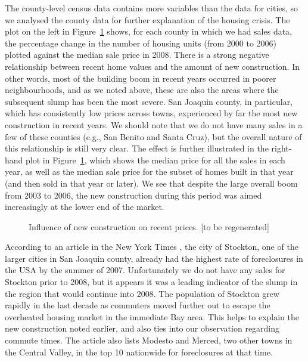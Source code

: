 \documentclass[oneside]{article}
\begin{document}
The county-level census data contains more variables than the data for cities, so we analysed the county data for further explanation of the housing crisis. The plot on the left in Figure~\ref{fig:newconstruct} shows, for each county in which we had sales data, the percentage change in the number of housing units (from 2000 to 2006) plotted against the median sale price in 2008. There is a strong negative relationship between recent home values and the amount of new construction. In other words, most of the building boom in recent years occurred in poorer neighbourhoods, and as we noted above, these are also the areas where the subsequent slump has been the most severe. San Joaquin county, in particular, which has consistently low prices across towns, experienced by far the most new construction in recent years.  We should note that we do not have many sales in a few of these counties (e.g., San Benito and Santa Cruz), but the overall nature of this relationship is still very clear. The effect is further illustrated in the right-hand plot in Figure~\ref{fig:newconstruct}, which shows the median price for all the sales in each year, as well as the median sale price for the subset of homes built in that year (and then sold in that year or later). We see that despite the large overall boom from 2003 to 2006, the new construction during this period was aimed increasingly at the lower end of the market.  

\begin{figure}[htbp]
  \centering
  \caption{Influence of new construction on recent prices. [to be regenerated]}
  \label{fig:newconstruct}
\end{figure}

According to an article in the New York Times \citep{mckinley:2007}, the city of Stockton, one of the larger cities in San Joaquin county, already had the highest rate of foreclosures in the USA by the summer of 2007. Unfortunately we do not have any sales for Stockton prior to 2008, but it appears it was a leading indicator of the slump in the region that would continue into 2008. The population of Stockton grew rapidly in the last decade as commuters moved further out to escape the overheated housing market in the immediate Bay area. This helps to explain the new construction noted earlier, and also ties into our observation regarding commute times. The article also lists Modesto and Merced, two other towns in the Central Valley, in the top 10 nationwide for foreclosures at that time.   
\end{document}

